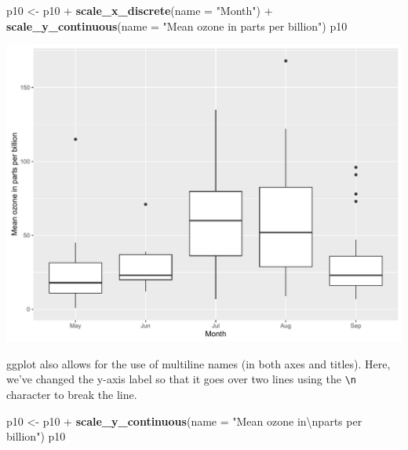 \documentclass[]{article}
\newenvironment{Shaded}{\begin{snugshade}}{\end{snugshade}}
\newcommand{\KeywordTok}[1]{\textcolor[rgb]{0.13,0.29,0.53}{\textbf{{#1}}}}
\newcommand{\DataTypeTok}[1]{\textcolor[rgb]{0.13,0.29,0.53}{{#1}}}
\newcommand{\CharTok}[1]{\textcolor[rgb]{0.31,0.60,0.02}{{#1}}}
\newcommand{\StringTok}[1]{\textcolor[rgb]{0.31,0.60,0.02}{{#1}}}
\newcommand{\NormalTok}[1]{{#1}}
\begin{document}
\begin{Shaded}
\begin{Highlighting}[]
\NormalTok{p10 <-}\StringTok{ }\NormalTok{p10 +}\StringTok{ }\KeywordTok{scale_x_discrete}\NormalTok{(}\DataTypeTok{name =} \StringTok{"Month"}\NormalTok{) +}
\StringTok{        }\KeywordTok{scale_y_continuous}\NormalTok{(}\DataTypeTok{name =} \StringTok{"Mean ozone in parts per billion"}\NormalTok{)}
\NormalTok{p10}
\end{Highlighting}
\end{Shaded}

\begin{center}\includegraphics{0_all_posts_pdf/box_2-1} \end{center}

ggplot also allows for the use of multiline names (in both axes and
titles). Here, we've changed the y-axis label so that it goes over two
lines using the \texttt{\textbackslash{}n} character to break the line.

\begin{Shaded}
\begin{Highlighting}[]
\NormalTok{p10 <-}\StringTok{ }\NormalTok{p10 +}\StringTok{ }\KeywordTok{scale_y_continuous}\NormalTok{(}\DataTypeTok{name =} \StringTok{"Mean ozone in}\CharTok{\textbackslash{}n}\StringTok{parts per billion"}\NormalTok{)}
\NormalTok{p10}
\end{Highlighting}
\end{Shaded}
\end{document}
